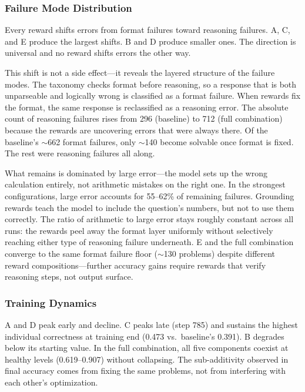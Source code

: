 \nestunindent
\subsubsection{Failure Mode Distribution}
\nestindent

Every reward shifts errors from format failures toward reasoning failures.
A, C, and E produce the largest shifts.
B and D produce smaller ones.
The direction is universal and no reward shifts errors the other way.

This shift is not a side effect---it reveals the layered structure of the failure modes.
The taxonomy checks format before reasoning, so a response that is both unparseable and logically wrong is classified as a format failure.
When rewards fix the format, the same response is reclassified as a reasoning error.
The absolute count of reasoning failures rises from 296 (baseline) to 712 (full combination) because the rewards are uncovering errors that were always there.
Of the baseline's $\sim$662 format failures, only $\sim$140 become solvable once format is fixed.
The rest were reasoning failures all along.

What remains is dominated by large error---the model sets up the wrong calculation entirely, not arithmetic mistakes on the right one.
In the strongest configurations, large error accounts for 55--62\% of remaining failures.
Grounding rewards teach the model to include the question's numbers, but not to use them correctly.
The ratio of arithmetic to large error stays roughly constant across all runs: the rewards peel away the format layer uniformly without selectively reaching either type of reasoning failure underneath.
E and the full combination converge to the same format failure floor ($\sim$130 problems) despite different reward compositions---further accuracy gains require rewards that verify reasoning steps, not output surface.

\nestunindent
\subsubsection{Training Dynamics}
\nestindent

A and D peak early and decline.
C peaks late (step 785) and sustains the highest individual correctness at training end (0.473 vs.\ baseline's 0.391).
B degrades below its starting value.
In the full combination, all five components coexist at healthy levels (0.619--0.907) without collapsing.
The sub-additivity observed in final accuracy comes from fixing the same problems, not from interfering with each other's optimization.

